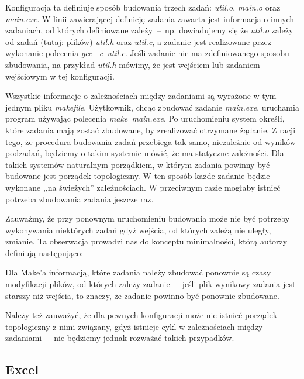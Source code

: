 Konfiguracja ta definiuje sposób budowania trzech zadań: \textit{util.o}, \textit{main.o} oraz \textit{main.exe}. W linii zawierającej definicję zadania zawarta jest informacja o innych zadaniach, od których definiowane zależy~--~np. dowiadujemy się że \textit{util.o} zależy od zadań (tutaj: plików) \textit{util.h} oraz \textit{util.c}, a zadanie jest realizowane przez wykonanie polecenia \textit{gcc~\nobreakdash-c~util.c}. Jeśli zadanie nie ma zdefiniowanego sposobu zbudowania, na przykład \textit{util.h} mówimy, że jest wejściem lub zadaniem wejściowym w tej konfiguracji.

Wszystkie informacje o zależnościach między zadaniami są wyrażone w tym jednym pliku \textit{makefile}. Użytkownik, chcąc zbudować zadanie \textit{main.exe}, uruchamia program używając polecenia \textit{make~main.exe}. Po uruchomieniu system określi, które zadania mają zostać zbudowane, by zrealizować otrzymane żądanie. Z racji tego, że procedura budowania zadań przebiega tak samo, niezależnie od wyników podzadań, będziemy o takim systemie mówić, że ma statyczne zależności. Dla takich systemów naturalnym porządkiem, w którym zadania powinny być budowane jest porządek topologiczny. W ten sposób każde zadanie będzie wykonane ,,na świeżych'' zależnościach. W przeciwnym razie mogłaby istnieć potrzeba zbudowania zadania jeszcze raz.

Zauważmy, że przy ponownym uruchomieniu budowania może nie być potrzeby wykonywania niektórych zadań gdyż wejścia, od których zależą nie uległy, zmianie. Ta obserwacja prowadzi nas do konceptu minimalności, którą autorzy definiują następująco:


Dla Make'a informacją, które zadania należy zbudować ponownie są czasy modyfikacji plików, od których zależy zadanie~--~jeśli plik wynikowy zadania jest starszy niż wejścia, to znaczy, że zadanie powinno być ponownie zbudowane.

Należy też zauważyć, że dla pewnych konfiguracji może nie istnieć porządek topologiczny z nimi związany, gdyż istnieje cykl w zależnościach między zadaniami~--~nie będziemy jednak rozważać takich przypadków.

\subsection{Excel}

